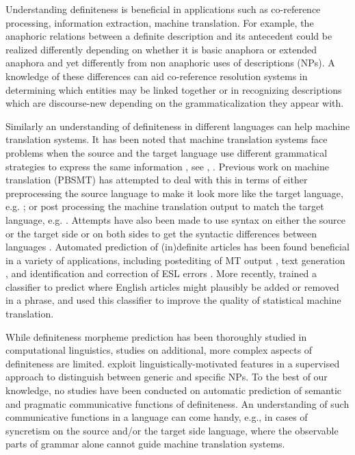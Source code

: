\documentclass[11pt,letterpaper]{article}
\newcommand{\ensuretext}[1]{#1}
\newcommand{\ytmarker}{\ensuretext{\textcolor{blue}{\ensuremath{^{\textsc{Y}}_{\textsc{T}}}}}}
\newcommand{\arkcomment}[3]{\ensuretext{\textcolor{#3}{[#1 #2]}}}
\newcommand{\yt}[1]{\arkcomment{\ytmarker}{#1}{blue}}
\newcommand{\finalversion}[1]{}
\begin{document}
Understanding definiteness is beneficial in applications such as co-reference processing, information extraction, machine translation. For example, the anaphoric relations between a definite description and its antecedent could be realized differently depending on whether it is basic anaphora or extended anaphora and yet differently from non anaphoric uses of descriptions (NPs). A knowledge of these differences can aid co-reference resolution systems in determining which entities may be linked together or in recognizing descriptions which are discourse-new depending on the grammaticalization they appear with. 

Similarly an understanding of definiteness in different languages can help machine translation systems. It has been noted that machine translation systems face problems when the source and the target language use different grammatical strategies to express the same information , see \cite{stymne09}, \cite{tsvetkov13}. Previous work on machine translation (PBSMT) has attempted to deal with this in terms of either preprocessing the source language to make it look more like the target language, e.g. \cite{collins05, habash07, niesen00, stymne09}; or post processing the machine translation output to match the target language, e.g. \cite{popovic06}. Attempts have also been made to use syntax on either the source or the target side or on both sides to get the syntactic differences between languages \cite{liu06, yamada02, zhang07}. Automated prediction of (in)definite articles has been found beneficial in a variety of applications, including postediting of MT output \citep{knight1994automated}, text generation \citep{DBLP:conf/aaai/Elhadad93,minnen2000memory}, and identification and correction of ESL errors \citep{aehan2006detecting,de2008classifier,gamon2008,rozovskaya2010training}. More recently, \citet{tsvetkov13} trained a classifier to predict where English articles might plausibly be added or removed in a phrase, 
and used this classifier to improve the quality of statistical machine translation. 

While definiteness morpheme prediction has been thoroughly studied in computational linguistics, studies on additional, more complex aspects of definiteness are limited.  
\citet{reiter10}  exploit linguistically-motivated features in a supervised approach to 
distinguish between generic and specific NPs.\finalversion{\yt{what else?}}
To the best of our knowledge, no studies have been conducted 
on automatic prediction of semantic and pragmatic communicative functions of definiteness. An understanding of such communicative functions in a language can come handy, e.g., in cases of syncretism on the source and/or the target side language, where the observable parts of grammar alone cannot guide machine translation systems. 
\end{document}
